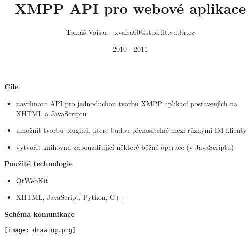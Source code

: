 \documentclass[9pt]{beamer}
\title{XMPP API pro webové aplikace}
\author{Tomáš Vaisar - xvaisa00@stud.fit.vutbr.cz}
\institute{FIT VUT v Brně}
\date{2010 - 2011}
\begin{document}
\begin{frame}
\titlepage
\end{frame}


\begin{frame}

	\textbf{Cíle}
	\begin{itemize}
		\item navrhnout API pro jednoduchou tvorbu XMPP aplikací postavených na XHTML a JavaScriptu
		\item umožnit tvorbu pluginů, které budou přenositelné mezi různými IM klienty
		\item vytvořit knihovnu zapouzdřující některé běžné operace (v JavaScriptu)
	\end{itemize}

	\vspace{5mm}
	
	\textbf{Použité technologie}
	\begin{itemize}
		\item QtWebKit
		\item XHTML, JavaScript, Python, C++
	\end{itemize}
	
\end{frame}
	\begin{comment}
	\textbf{Proč web?}
	\begin{itemize}
		\item vývoj webu je snadnější a rychlejší než vývoj stand-alone aplikace
		\item webové aplikace jsou skutečně multiplatformní 
	\end{itemize}
	
	\textbf{Proč XMPP?}
	\begin{itemize}
		\item otevřený standard
		\item šifrováníX
	\end{itemize}
	\end{comment}



\begin{frame}

	\textbf{Schéma komunikace}

	\begin{center}
		\texttt{[image: drawing.png]}
	\end{center}
\end{frame}
\end{document}
